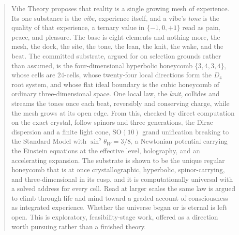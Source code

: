 \begin{abstract}
Vibe Theory proposes that reality is a single growing mesh of experience. Its one substance is the \emph{vibe}, experience itself, and a vibe's \emph{tone} is the quality of that experience, a ternary value in $\{-1, 0, +1\}$ read as pain, peace, and pleasure. The base is eight elements and nothing more, the mesh, the dock, the site, the tone, the lean, the knit, the wake, and the beat. The committed substrate, argued for on selection grounds rather than assumed, is the four-dimensional hyperbolic honeycomb $\{3,4,3,4\}$, whose cells are 24-cells, whose twenty-four local directions form the $D_4$ root system, and whose flat ideal boundary is the cubic honeycomb of ordinary three-dimensional space. One local law, the \emph{knit}, collides and streams the tones once each beat, reversibly and conserving charge, while the mesh grows at its open edge. From this, checked by direct computation on the exact crystal, follow spinors and three generations, the Dirac dispersion and a finite light cone, $\mathrm{SO}(10)$ grand unification breaking to the Standard Model with $\sin^2\theta_W = 3/8$, a Newtonian potential carrying the Einstein equations at the effective level, holography, and an accelerating expansion. The substrate is shown to be the unique regular honeycomb that is at once crystallographic, hyperbolic, spinor-carrying, and three-dimensional in its cusp, and it is computationally universal with a solved address for every cell. Read at larger scales the same law is argued to climb through life and mind toward a graded account of consciousness as integrated experience. Whether the universe began or is eternal is left open. This is exploratory, feasibility-stage work, offered as a direction worth pursuing rather than a finished theory.
\end{abstract}
